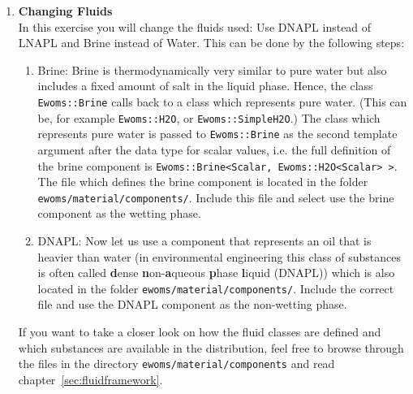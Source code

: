 \begin{enumerate}
\item \textbf{Changing Fluids} \\
  In this exercise you will change the fluids used: Use DNAPL instead
  of LNAPL and Brine instead of Water. This can be done by the
  following steps:
\begin{enumerate}
\item Brine: Brine is thermodynamically very similar to pure water but
  also includes a fixed amount of salt in the liquid phase.  Hence,
  the class \texttt{Ewoms::Brine} calls back to a class which
  represents pure water. (This can be, for example
  \texttt{Ewoms::H2O}, or \texttt{Ewoms::SimpleH2O}.) The class which
  represents pure water is passed to \texttt{Ewoms::Brine} as the
  second template argument after the data type for scalar values,
  i.e. the full definition of the brine component is
  \texttt{Ewoms::Brine<Scalar, Ewoms::H2O<Scalar> >}. The file which
  defines the brine component is located in the folder
  \texttt{ewoms/material/components/}.  Include this file and select
  use the brine component as the wetting phase.
\item DNAPL: Now let us use a component that represents an oil that
  is heavier than water (in environmental engineering this class of
  substances is often called \textbf{d}ense
  \textbf{n}on-\textbf{a}queous \textbf{p}hase \textbf{l}iquid
  (DNAPL)) which is also located in the folder
  \texttt{ewoms/material/components/}. Include the correct file and
  use the DNAPL component as the non-wetting phase.
\end{enumerate}
If you want to take a closer look on how the fluid classes are defined
and which substances are available in the \eWoms distribution, feel
free to browse through the files in the directory
\texttt{ewoms/material/components} and read
chapter~\ref{sec:fluidframework}.


\end{enumerate}

